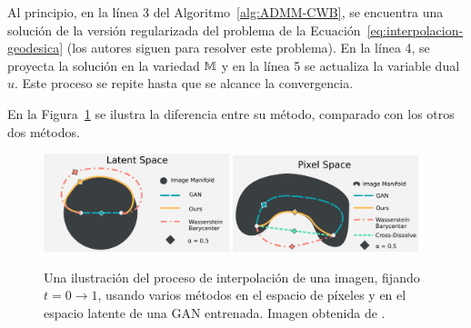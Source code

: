 Al principio, en la línea 3 del Algoritmo~\ref{alg:ADMM-CWB}, se encuentra una solución de la versión regularizada del problema de la Ecuación~\eqref{eq:interpolacion-geodesica} (los autores siguen \cite{cuturi2016smoothed} para resolver este problema). En la línea 4, se proyecta la solución en la variedad $\mathbb{M}$ y en la línea 5 se actualiza la variable dual $u$. Este proceso se repite hasta que se alcance la convergencia.

En la Figura~\ref{fig:latent-pixel-space} se ilustra la diferencia entre su método, comparado con los otros dos métodos.

\begin{figure}[H]
	\centering
	\includegraphics[width=0.48\textwidth]{img/cbw/latent-space.png}
	\includegraphics[width=0.48\textwidth]{img/cbw/pixel-space.png}
	\caption{
		Una ilustración del proceso de interpolación de una imagen, fijando $t = 0 \to 1$, usando varios métodos en el espacio de píxeles y en el espacio latente de una GAN entrenada.
		Imagen obtenida de \cite{simon2020barycenters}.
	}
	\label{fig:latent-pixel-space}
\end{figure}
